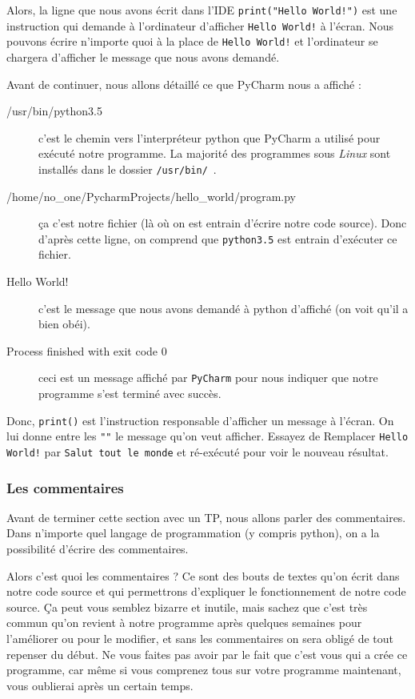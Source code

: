 \documentclass[12pt]{article}
\newcommand{\code}[1]{\colorbox{light-gray}{\texttt{#1}}}
\begin{document}
        Alors, la ligne que nous avons écrit dans l'IDE \code{print("Hello World!")} est une instruction qui demande
        à l'ordinateur d'afficher \code{Hello World!} à l'écran. Nous pouvons écrire n'importe quoi à la place de 
        \code{Hello World!} et l'ordinateur se chargera d'afficher le message que nous avons demandé. 
        
        Avant de continuer, nous allons détaillé ce que PyCharm nous a affiché :
        \begin{description}
            \item[/usr/bin/python3.5] c'est le chemin vers l'interpréteur python que PyCharm a utilisé pour 
                exécuté notre programme. La majorité des programmes sous \emph{Linux} sont installés dans le dossier 
                \code{/usr/bin/}\ .
            \item[/home/no\_one/PycharmProjects/hello\_world/program.py] ça c'est notre fichier (là où on est entrain 
                d'écrire notre code source). Donc d'après cette ligne, on comprend que \code{python3.5} est entrain
                d'exécuter ce fichier.
            \item[Hello World!] c'est le message que nous avons demandé à python d'affiché (on voit qu'il a bien 
                obéi).
            \item[Process finished with exit code 0] ceci est un message affiché par \code{PyCharm} pour nous indiquer
                que notre programme s'est terminé avec succès.  
        \end{description}

        Donc, \code{print()} est l'instruction responsable d'afficher un message à l'écran. On lui donne entre 
        les \code{""} le message qu'on veut afficher.
        Essayez de Remplacer \code{Hello World!} par \code{Salut tout le monde} et ré-exécuté pour voir le nouveau résultat. 

        \subsubsection{Les commentaires}
            Avant de terminer cette section avec un TP, nous allons parler des commentaires. 
            Dans n'importe quel langage de programmation (y compris python), on a la possibilité d'écrire des commentaires.

            Alors c'est quoi les commentaires ? Ce sont des bouts de textes qu'on écrit dans notre code source et qui
            permettrons d'expliquer le fonctionnement de notre code source. Ça peut vous semblez bizarre et inutile, mais
            sachez que c'est très commun qu'on revient à notre programme après quelques semaines pour l'améliorer 
            ou pour le modifier, et sans les commentaires on sera obligé de tout repenser du début. Ne vous faites pas 
            avoir par le fait que c'est vous qui a crée ce programme, car même si vous comprenez tous sur votre
            programme maintenant, vous oublierai après un certain temps.
\end{document}
